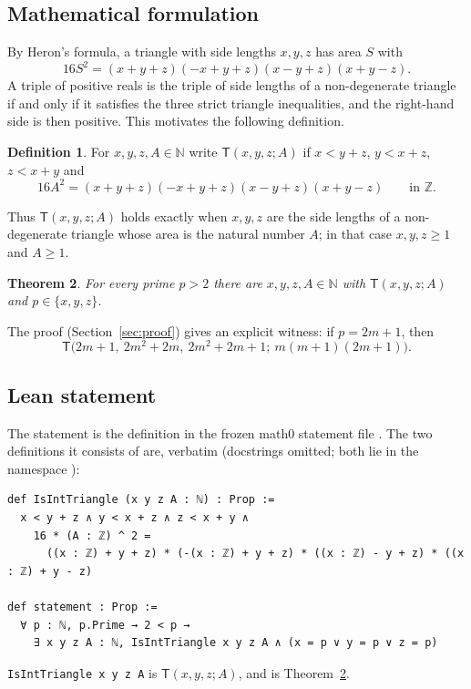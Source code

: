 \documentclass[11pt]{amsart}
\theoremstyle{plain}
\newtheorem{theorem}{Theorem}
\theoremstyle{definition}
\newtheorem{definition}[theorem]{Definition}
\newcommand{\N}{\mathbb{N}}
\newcommand{\Z}{\mathbb{Z}}
\newcommand{\T}{\mathsf{T}}
\begin{document}
\subsection*{Mathematical formulation}
By Heron's formula, a triangle with side lengths $x,y,z$ has area $S$ with
\[
  16S^2=(x+y+z)(-x+y+z)(x-y+z)(x+y-z).
\]
A triple of positive reals is the triple of side lengths of a non-degenerate triangle if and only if it satisfies the three strict triangle inequalities, and the right-hand side is then positive.
This motivates the following definition.

\begin{definition}\label{def:T}
For $x,y,z,A\in\N$ write $\T(x,y,z;A)$ if $x<y+z$, $y<x+z$, $z<x+y$ and
\[
  16A^2=(x+y+z)(-x+y+z)(x-y+z)(x+y-z)\qquad\text{in }\Z.
\]
\end{definition}

Thus $\T(x,y,z;A)$ holds exactly when $x,y,z$ are the side lengths of a non-degenerate triangle whose area is the natural number $A$; in that case $x,y,z\ge1$ and $A\ge1$.

\begin{theorem}\label{thm:main}
For every prime $p>2$ there are $x,y,z,A\in\N$ with $\T(x,y,z;A)$ and $p\in\{x,y,z\}$.
\end{theorem}

The proof (Section~\ref{sec:proof}) gives an explicit witness: if $p=2m+1$, then
\[
  \T\bigl(2m+1,\ 2m^2+2m,\ 2m^2+2m+1;\ m(m+1)(2m+1)\bigr).
\]

\subsection*{Lean statement}
The statement is the definition  in the frozen math0 statement file .
The two definitions it consists of are, verbatim (docstrings omitted; both lie in the namespace ):
\begin{lstlisting}
def IsIntTriangle (x y z A : ℕ) : Prop :=
  x < y + z ∧ y < x + z ∧ z < x + y ∧
    16 * (A : ℤ) ^ 2 =
      ((x : ℤ) + y + z) * (-(x : ℤ) + y + z) * ((x : ℤ) - y + z) * ((x : ℤ) + y - z)

def statement : Prop :=
  ∀ p : ℕ, p.Prime → 2 < p →
    ∃ x y z A : ℕ, IsIntTriangle x y z A ∧ (x = p ∨ y = p ∨ z = p)
\end{lstlisting}
\texttt{IsIntTriangle x y z A} is $\T(x,y,z;A)$, and  is Theorem~\ref{thm:main}.
\end{document}
